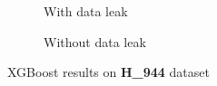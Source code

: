         \begin{figure}[H]
            \centering
            \begin{subfigure}{0.47\textwidth}
              \centering
              \resizebox{\textwidth}{!}{}
              \captionsetup{justification=centering}
              \caption{With data leak}
            \end{subfigure}%
            \hspace{0.05\textwidth}
            \begin{subfigure}{0.47\textwidth}
              \centering
              \resizebox{\textwidth}{!}{}
              \captionsetup{justification=centering}
              \caption{Without data leak}
            \end{subfigure}
            \caption{XGBoost results on \textbf{H\_944} dataset}\label{fig:xgb_m944}
        \end{figure}

